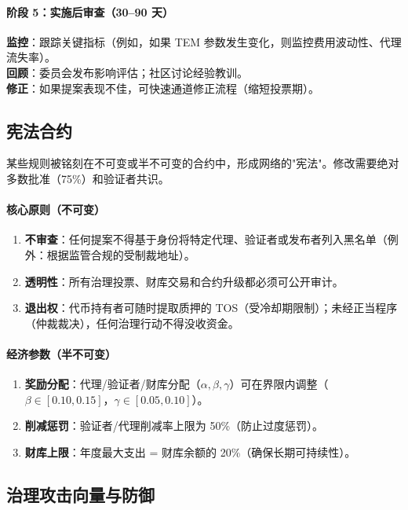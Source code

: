 \documentclass[11pt]{article}
\begin{document}
\paragraph{阶段 5：实施后审查（30--90 天）}
\textbf{监控}：跟踪关键指标（例如，如果 TEM 参数发生变化，则监控费用波动性、代理流失率）。\\
\textbf{回顾}：委员会发布影响评估；社区讨论经验教训。\\
\textbf{修正}：如果提案表现不佳，可快速通道修正流程（缩短投票期）。

\subsection{宪法合约}

某些规则被铭刻在不可变或半不可变的合约中，形成网络的"宪法"。修改需要绝对多数批准（75\%）和验证者共识。

\paragraph{核心原则（不可变）}
\begin{enumerate}[noitemsep]
  \item \textbf{不审查}：任何提案不得基于身份将特定代理、验证者或发布者列入黑名单（例外：根据监管合规的受制裁地址）。
  \item \textbf{透明性}：所有治理投票、财库交易和合约升级都必须可公开审计。
  \item \textbf{退出权}：代币持有者可随时提取质押的 TOS（受冷却期限制）；未经正当程序（仲裁裁决），任何治理行动不得没收资金。
\end{enumerate}

\paragraph{经济参数（半不可变）}
\begin{enumerate}[noitemsep]
  \item \textbf{奖励分配}：代理/验证者/财库分配（$\alpha, \beta, \gamma$）可在界限内调整（$\beta \in [0.10, 0.15]$，$\gamma \in [0.05, 0.10]$）。
  \item \textbf{削减惩罚}：验证者/代理削减率上限为 50\%（防止过度惩罚）。
  \item \textbf{财库上限}：年度最大支出 = 财库余额的 20\%（确保长期可持续性）。
\end{enumerate}

\subsection{治理攻击向量与防御}
\end{document}
